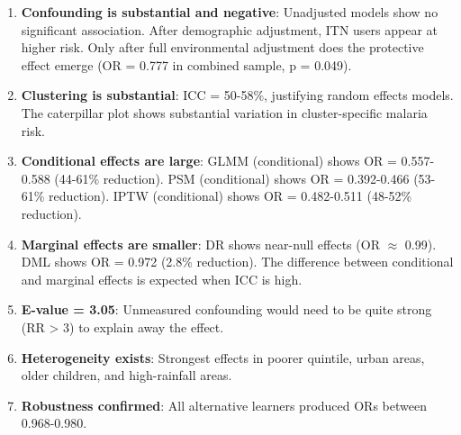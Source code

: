 \begin{enumerate}
	\item \textbf{Confounding is substantial and negative}: Unadjusted models show no significant association. After demographic adjustment, ITN users appear at higher risk. Only after full environmental adjustment does the protective effect emerge (OR = 0.777 in combined sample, p = 0.049).
	
	\item \textbf{Clustering is substantial}: ICC = 50-58\%, justifying random effects models. The caterpillar plot shows substantial variation in cluster-specific malaria risk.
	
	\item \textbf{Conditional effects are large}: GLMM (conditional) shows OR = 0.557-0.588 (44-61\% reduction). PSM (conditional) shows OR = 0.392-0.466 (53-61\% reduction). IPTW (conditional) shows OR = 0.482-0.511 (48-52\% reduction).
	
	\item \textbf{Marginal effects are smaller}: DR shows near-null effects (OR $\approx$ 0.99). DML shows OR = 0.972 (2.8\% reduction). The difference between conditional and marginal effects is expected when ICC is high.
	
	\item \textbf{E-value = 3.05}: Unmeasured confounding would need to be quite strong (RR > 3) to explain away the effect.
	
	\item \textbf{Heterogeneity exists}: Strongest effects in poorer quintile, urban areas, older children, and high-rainfall areas.
	
	\item \textbf{Robustness confirmed}: All alternative learners produced ORs between 0.968-0.980.
\end{enumerate}